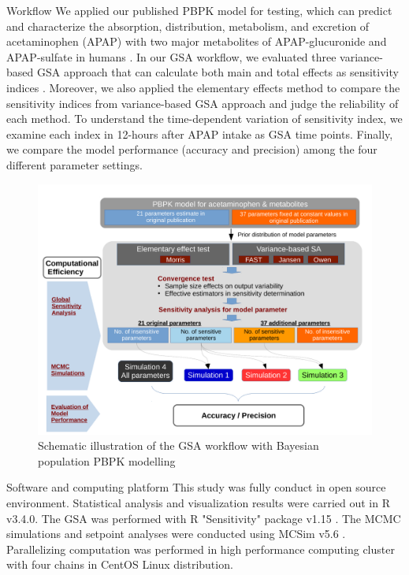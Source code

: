 \documentclass[xcolor=table]{beamer}
\begin{document}
\begin{frame}[t]
\begin{columns}[t]
\begin{column}{0.25\paperwidth}

\begin{alertblock}{Workflow}
We applied our published PBPK model for testing, which can predict and characterize the absorption, distribution, metabolism, and excretion of acetaminophen (APAP) with two major metabolites of APAP-glucuronide and APAP-sulfate in humans \cite{Zurlinden}.
In our GSA workflow, we evaluated three variance-based GSA approach that can calculate both main and total effects as sensitivity indices \cite{McNally, Jansen, Owen}.
Moreover, we also applied the elementary effects method to compare the sensitivity indices from variance-based GSA approach and judge the reliability of each method. 
To understand the time-dependent variation of sensitivity index, we examine each index in 12-hours after APAP intake as GSA time points.
Finally, we compare the model performance (accuracy and precision) among the four different parameter settings.

\begin{figure}
\includegraphics[width=0.9\linewidth]{fig0.pdf}
\caption{Schematic illustration of the GSA workflow with Bayesian population PBPK modelling}
\end{figure}

\end{alertblock}

\begin{alertblock}{Software and computing platform}
This study was fully conduct in open source environment. 
Statistical analysis and visualization results were carried out in R v3.4.0.
The GSA was performed with R "Sensitivity" package v1.15 \cite{Pujol17}. 
The MCMC simulations and setpoint analyses were conducted using MCSim v5.6 \cite{Bois09}.
Parallelizing computation was performed in high performance computing cluster with four chains in CentOS Linux distribution.


\end{alertblock}
\end{column}
\end{columns}
\end{frame}
\end{document}
